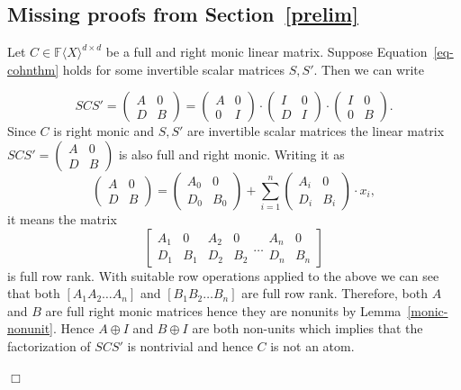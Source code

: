 \documentclass[10pt,a4paper]{article}
\newenvironment{proofof}[1]{\noindent{\it Proof of #1. }} {{\qed}}
\def\qed{\hspace*{\fill} $\Box$\par\medskip}
\newcommand{\F}{\mathbb{F}}
\renewcommand{\angle}[1]{\langle #1 \rangle}
\newcommand{\FX}{\F\angle{X}}
\newcommand{\fR}{\FX}
\begin{document}
\subsection{Missing proofs from Section~\ref{prelim}}

\begin{proofof}{Theorem~\ref{cohnthm}}
Let $C\in\fR^{d\times d}$ be a full and right monic linear
matrix. Suppose Equation~\ref{eq-cohnthm} holds for some invertible
scalar matrices $S,S'$. Then we can write

\[
SCS'=  \left(
\begin{array}{cc}
A & 0 \\
D & B
\end{array}
\right) =   \left(
\begin{array}{cc}
A & 0 \\
0 & I
\end{array}
\right)\cdot 
  \left(
\begin{array}{cc}
I & 0 \\
D & I
\end{array}
\right)\cdot
\left(
\begin{array}{cc}
I & 0 \\
0 & B
\end{array}
\right).
\]
Since $C$ is right monic and $S, S'$ are invertible scalar matrices
the linear matrix $SCS'=\left(\begin{array}{cc} A & 0 \\ D & B
\end{array}\right)$ is also full and right monic. Writing it as
\[
\left(
\begin{array}{cc}
A & 0 \\
D & B
\end{array}
\right) =   \left(
\begin{array}{cc}
A_0 & 0 \\
D_0 & B_0
\end{array}
\right) + \sum_{i=1}^n \left(
\begin{array}{cc}
A_i & 0 \\
D_i & B_i
\end{array}
\right)\cdot x_i,
\]
it means the matrix
\[
\left[
\begin{array}{cc|}
A_1 & 0 \\
D_1 & B_1
\end{array}
\begin{array}{cc|}
A_2 & 0 \\
D_2 & B_2
\end{array}
 \ldots
\begin{array}{|cc}
A_n & 0 \\
D_n & B_n
\end{array}
\right]
\]
is full row rank. With suitable row operations applied to the above we
can see that both $[A_1 A_2\ldots A_n]$ and $[B_1 B_2 \ldots B_n]$ are
full row rank. Therefore, both $A$ and $B$ are full right monic
matrices hence they are nonunits by Lemma~\ref{monic-nonunit}.  Hence $A\oplus I$ and $B\oplus I$ are both non-units  which
implies that the factorization of $SCS'$ is nontrivial and hence $C$
is not an atom. 


\end{proofof}
\end{document}
